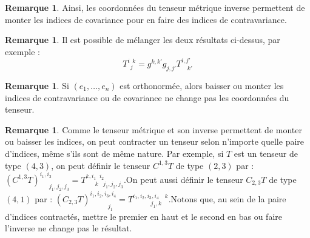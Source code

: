 \documentclass[12pt,a4paper]{article}
\theoremstyle{definition}
\newtheorem{rqe}[thm]{Remarque}
\begin{document}
\begin{rqe}
Ainsi, les coordonnées du tenseur métrique inverse permettent de \og monter \fg{} les indices de covariance pour en faire des indices de contravariance.
\end{rqe}
\begin{rqe}
Il est possible de mélanger les deux résultats ci-dessus, par exemple :
$$T^{i\,\;k}_{\,\;j}=g^{k,k'}g_{j,j'}T^{i,j'}_{\quad k'}$$
\end{rqe}
\begin{rqe}
Si $(e_1,\ldots,e_n)$ est orthonormée, alors \og baisser \fg{} ou \og monter \fg{} les indices de contravariance ou de covariance ne change pas les coordonnées du tenseur.  
\end{rqe}
\begin{rqe}
Comme le tenseur métrique et son inverse permettent de \og monter \fg{} ou \og baisser \fg{} les indices, on peut contracter un tenseur selon n'importe quelle paire d'indices, même s'ils sont de même nature. Par exemple, si $T$ est un tenseur de type $(4,3)$, on peut définir le tenseur $C^{1,3}T$ de type $(2,3)$ par : $\left(C^{1,3}T\right)_{\;\;\quad j_1,j_2,j_3}^{i_1,i_2}=T_{\quad\;\;k\;\;\; j_1,j_2,j_3}^{k,i_1\;\;i_2}$.\newline On peut aussi définir le tenseur $C_{2,3}T$ de type $(4,1)$ par : $\left(C_{2,3}T\right)_{\quad\qquad j_1}^{i_1,i_2,i_3,i_4}=T_{\quad\qquad j_1,k}^{i_1,i_2,i_3,i_4\quad k}$.\newline Notons que, au sein de la paire d'indices contractés, mettre le premier en haut et le second en bas ou faire l'inverse ne change pas le résultat.
\end{rqe}
\newpage
\end{document}
